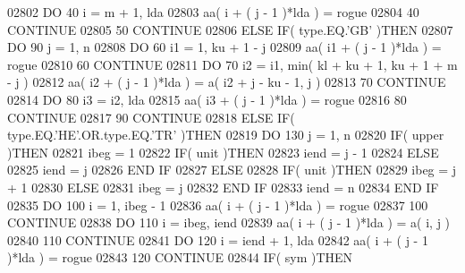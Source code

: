 \begin{DoxyCode}
02802             \textcolor{keywordflow}{DO} 40 i = m + 1, lda
02803                aa( i + ( j - 1 )*lda ) = rogue
02804    40       \textcolor{keywordflow}{CONTINUE}
02805    50    \textcolor{keywordflow}{CONTINUE}
02806       \textcolor{keywordflow}{ELSE} \textcolor{keywordflow}{IF}( type.EQ.\textcolor{stringliteral}{'GB'} )\textcolor{keywordflow}{THEN}
02807          \textcolor{keywordflow}{DO} 90 j = 1, n
02808             \textcolor{keywordflow}{DO} 60 i1 = 1, ku + 1 - j
02809                aa( i1 + ( j - 1 )*lda ) = rogue
02810    60       \textcolor{keywordflow}{CONTINUE}
02811             \textcolor{keywordflow}{DO} 70 i2 = i1, min( kl + ku + 1, ku + 1 + m - j )
02812                aa( i2 + ( j - 1 )*lda ) = a( i2 + j - ku - 1, j )
02813    70       \textcolor{keywordflow}{CONTINUE}
02814             \textcolor{keywordflow}{DO} 80 i3 = i2, lda
02815                aa( i3 + ( j - 1 )*lda ) = rogue
02816    80       \textcolor{keywordflow}{CONTINUE}
02817    90    \textcolor{keywordflow}{CONTINUE}
02818       \textcolor{keywordflow}{ELSE} \textcolor{keywordflow}{IF}( type.EQ.\textcolor{stringliteral}{'HE'}.OR.type.EQ.\textcolor{stringliteral}{'TR'} )\textcolor{keywordflow}{THEN}
02819          \textcolor{keywordflow}{DO} 130 j = 1, n
02820             \textcolor{keywordflow}{IF}( upper )\textcolor{keywordflow}{THEN}
02821                ibeg = 1
02822                \textcolor{keywordflow}{IF}( unit )\textcolor{keywordflow}{THEN}
02823                   iend = j - 1
02824                \textcolor{keywordflow}{ELSE}
02825                   iend = j
02826 \textcolor{keywordflow}{               END IF}
02827             \textcolor{keywordflow}{ELSE}
02828                \textcolor{keywordflow}{IF}( unit )\textcolor{keywordflow}{THEN}
02829                   ibeg = j + 1
02830                \textcolor{keywordflow}{ELSE}
02831                   ibeg = j
02832 \textcolor{keywordflow}{               END IF}
02833                iend = n
02834 \textcolor{keywordflow}{            END IF}
02835             \textcolor{keywordflow}{DO} 100 i = 1, ibeg - 1
02836                aa( i + ( j - 1 )*lda ) = rogue
02837   100       \textcolor{keywordflow}{CONTINUE}
02838             \textcolor{keywordflow}{DO} 110 i = ibeg, iend
02839                aa( i + ( j - 1 )*lda ) = a( i, j )
02840   110       \textcolor{keywordflow}{CONTINUE}
02841             \textcolor{keywordflow}{DO} 120 i = iend + 1, lda
02842                aa( i + ( j - 1 )*lda ) = rogue
02843   120       \textcolor{keywordflow}{CONTINUE}
02844             \textcolor{keywordflow}{IF}( sym )\textcolor{keywordflow}{THEN}

\end{DoxyCode}
